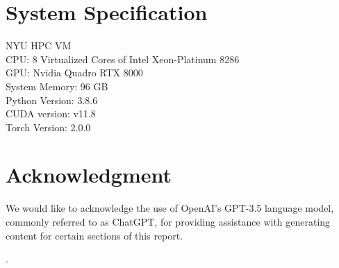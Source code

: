 \documentclass[letterpaper]{article} %
\begin{document}
\section{System Specification}
NYU HPC VM \\
CPU: 8 Virtualized Cores of Intel Xeon-Platinum 8286 \\
GPU: Nvidia Quadro RTX 8000 \\
System Memory: 96 GB \\
Python Version: 3.8.6 \\
CUDA version: v11.8 \\
Torch Version: 2.0.0 \\

\section{Acknowledgment}
We would like to acknowledge the use of OpenAI's GPT-3.5 language model, commonly referred to as ChatGPT, for providing assistance with generating content for certain sections of this report.

. \\
\end{document}
